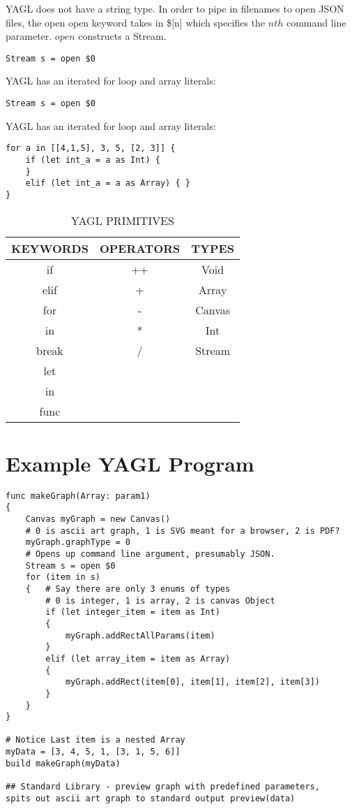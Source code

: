 \documentclass[12pt]{article}
\begin{document}
YAGL does not have a string type. In order to pipe in filenames to open JSON files, the open open keyword takes in \$[n] which specifies the $n{th}$ command line parameter. $open$ constructs a Stream.
\begin{lstlisting}
Stream s = open $0
\end{lstlisting}

YAGL has an iterated for loop and array literals:
\begin{lstlisting}
Stream s = open $0
\end{lstlisting}
YAGL has an iterated for loop and array literals:
\begin{lstlisting}
for a in [[4,1,5], 3, 5, [2, 3]] {
	if (let int_a = a as Int) {
	}
	elif (let int_a = a as Array) { }
}
\end{lstlisting}
\begin{table}[H]
\caption{YAGL PRIMITIVES}
\centering
\begin{tabular}{c c c }
\hline\hline
KEYWORDS & OPERATORS & TYPES \\ [0.5ex] %
\hline
if&++&Void \\
elif&+&Array \\
for&-&Canvas \\
in&*&Int \\
break&/&Stream \\
let\\
in\\
func \\

\hline
\end{tabular}
\end{table}

\section{Example YAGL Program}
\begin{lstlisting}
func makeGraph(Array: param1)
{
	Canvas myGraph = new Canvas()
	# 0 is ascii art graph, 1 is SVG meant for a browser, 2 is PDF?
	myGraph.graphType = 0
	# Opens up command line argument, presumably JSON.
	Stream s = open $0
	for (item in s)
	{	# Say there are only 3 enums of types
		# 0 is integer, 1 is array, 2 is canvas Object
		if (let integer_item = item as Int)
		{
			myGraph.addRectAllParams(item)
		}
		elif (let array_item = item as Array)
		{
			myGraph.addRect(item[0], item[1], item[2], item[3])
		}
	}
}

# Notice Last item is a nested Array 
myData = [3, 4, 5, 1, [3, 1, 5, 6]]
build makeGraph(myData)

## Standard Library - preview graph with predefined parameters, 
spits out ascii art graph to standard output preview(data)
\end{lstlisting}
\end{document}
